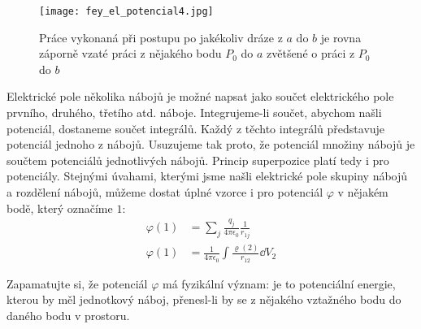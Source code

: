     \begin{figure}
      \centering
      \texttt{[image: fey\_el\_potencial4.jpg]}
      \caption{Práce vykonaná při postupu po jakékoliv dráze z \(a\) do \(b\) je rovna záporně     
               vzaté práci z nějakého bodu \(P_0\) do \(a\) zvětšené o práci z \(P_0\) do \(b\)}
      \label{FYZ:fig_fey_potencial4}
    \end{figure}

    Elektrické pole několika nábojů je možné napsat jako součet elektrického pole prvního, druhého, 
    třetího atd. náboje. Integrujeme-li součet, abychom našli potenciál, dostaneme součet integrálů. 
    Každý z těchto integrálů představuje potenciál jednoho z nábojů. Usuzujeme tak proto, že 
    potenciál množiny nábojů je součtem potenciálů jednotlivých nábojů. Princip superpozice platí 
    tedy i pro potenciály. Stejnými úvahami, kterými jsme našli elektrické pole skupiny nábojů a 
    rozdělení nábojů, můžeme dostat úplné vzorce i pro potenciál \(\varphi\) v nějakém bodě, který 
    označíme \(1\):
    \begin{align}
     \varphi(1) &= 
       \sum\limits_{j}\frac{q_j}{4\pi\epsilon_0}\frac{1}{r_{1j}}     \label{fyz:fey_eq_elstat24} \\ 
     \varphi(1) &= 
       \frac{1}{4\pi\epsilon_0}\int\frac{\varrho(2)}{r_{12}}\dd{V_2} \label{fyz:fey_eq_elstat25}
    \end{align}
     	    
    Zapamatujte si, že potenciál \(\varphi\) má fyzikální význam: je to potenciální energie, kterou 
    by měl jednotkový náboj, přenesl-li by se z nějakého vztažného bodu do daného bodu v prostoru.
    
